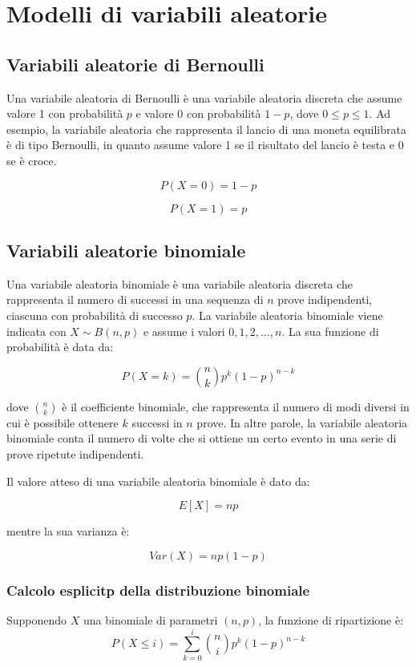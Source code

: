 \chapter{Modelli di variabili aleatorie}

\section{Variabili aleatorie di Bernoulli}
Una variabile aleatoria di Bernoulli è una variabile aleatoria discreta che assume valore 1 con probabilità $p$ e valore 0 con probabilità $1-p$, dove $0\leq p \leq 1$. Ad esempio, la variabile aleatoria che rappresenta il lancio di una moneta equilibrata è di tipo Bernoulli, in quanto assume valore 1 se il risultato del lancio è testa e 0 se è croce.

\begin{equation}
  P(X = 0) = 1 - p
\end{equation}

\begin{equation}
  P(X = 1) = p
\end{equation}
\section{Variabili aleatorie binomiale}
Una variabile aleatoria binomiale è una variabile aleatoria discreta che rappresenta il numero di successi in una sequenza di $n$ prove indipendenti, ciascuna con probabilità di successo $p$. La variabile aleatoria binomiale viene indicata con $X \sim B(n,p)$ e assume i valori $0, 1, 2, \ldots, n$. La sua funzione di probabilità è data da:

$$P(X=k) = \binom{n}{k} p^k (1-p)^{n-k}$$

dove $\binom{n}{k}$ è il coefficiente binomiale, che rappresenta il numero di modi diversi in cui è possibile ottenere $k$ successi in $n$ prove. In altre parole, la variabile aleatoria binomiale conta il numero di volte che si ottiene un certo evento in una serie di prove ripetute indipendenti.

Il valore atteso di una variabile aleatoria binomiale è dato da:

$$E[X] = np$$

mentre la sua varianza è:

$$Var(X) = np(1-p)$$


\subsection{Calcolo esplicitp della distribuzione binomiale}
Supponendo $X$ una binomiale di parametri $(n, p)$, la funzione di ripartizione è:
\begin{equation}
  P(X \leq i) = \sum_{k=0}^i \binom{n}{i} p^k(1-p)^{n-k}
\end{equation}

